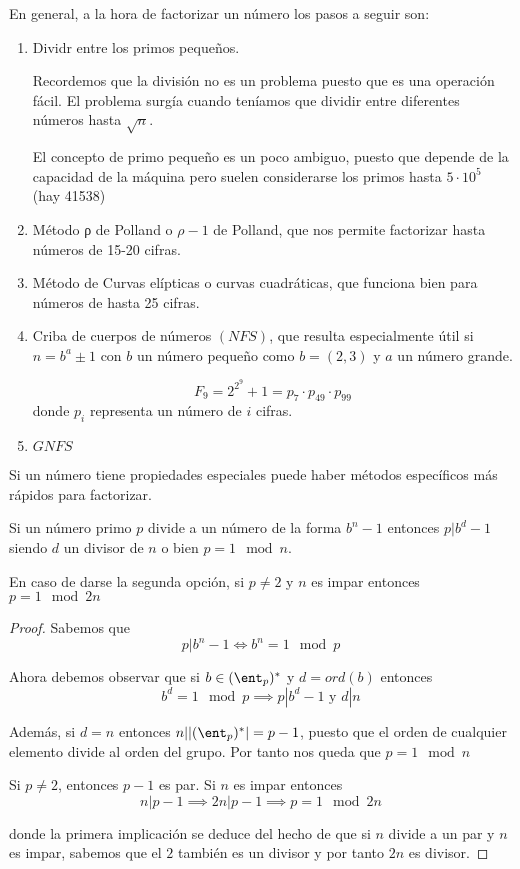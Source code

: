 En general, a la hora de factorizar un número los pasos a seguir son:
\begin{enumerate}
\item Dividr entre los primos pequeños.

Recordemos que la división no es un problema puesto que es una operación fácil. El problema surgía cuando teníamos que dividir entre diferentes números hasta $\sqrt{n}$.

El concepto de primo pequeño es un poco ambiguo, puesto que depende de la capacidad de la máquina pero suelen considerarse los primos hasta $5\cdot 10^{5}$ (hay 41538)

\item Método ρ de Polland o $ρ-1$ de Polland, que nos permite factorizar hasta números de 15-20 cifras.

\item Método de Curvas elípticas o curvas cuadráticas, que funciona bien para números de hasta 25 cifras.

\item Criba de cuerpos de números $(NFS)$, que resulta especialmente útil si $n=b^a\pm 1$ con $b$ un número pequeño como $b=(2,3)$ y $a$ un número grande.

\begin{example}
\[F_9 =2^{2^9}+1 = p_7\cdot p_{49} \cdot p_{99}\]
donde $p_i$ representa un número de $i$ cifras.
\end{example}

\item $GNFS$
\end{enumerate}

\obs Si un número tiene propiedades especiales puede haber métodos específicos más rápidos para factorizar.

\begin{prop}
Si un número primo $p$ divide a un número de la forma $b^n-1$ entonces $p|b^d-1$ siendo $d$ un divisor de $n$ o bien $p=1 \mod n$.

En caso de darse la segunda opción, si $p \neq 2$ y $n$ es impar entonces $p=1 \mod 2n$
\label{prop:pbn-1}
\end{prop}
\begin{proof}
Sabemos que
\[p|b^n-1 \iff b^n =1 \mod p\]

Ahora debemos observar que si $b \in (\ent_p)^*$ y $d=ord(b)$ entonces
\[b^d=1 \mod p \implies p|b^d-1 \text{ y } d|n\]

Además, si $d=n$ entonces $n||(\ent_p)^*|=p-1$, puesto que el orden de cualquier elemento divide al orden del grupo. Por tanto nos queda que $p=1\mod n$

Si $p\neq 2$, entonces $p-1$ es par. Si $n$ es impar entonces
\[n|p-1 \implies 2n|p-1 \implies p=1 \mod 2n\]

donde la primera implicación se deduce del hecho de que si $n$ divide a un par y $n$ es impar, sabemos que el $2$ también es un divisor y por tanto $2n$ es divisor.

\end{proof}

